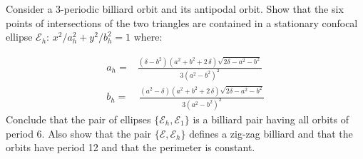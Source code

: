 \begin{exercise}
 Consider a 3-periodic billiard orbit and its antipodal orbit. Show that the six points of intersections of the two triangles are contained in a stationary confocal ellipse $\mathcal{E}_h$: $x^2/a_h^2+y^2/b_h^2=1$ where:


\begin{align*}
	a_h=& {\frac { \left(  \delta -b^2\right) \left( {a}^{2}+{b}^{2}+2\,\delta \right)\sqrt {2\delta-{a}^{2}-{b}^{2} 
			 }  }{3 \left( {a}^{2}-{
				b}^{2} \right) ^{2}}}\\
b_h=&  \,{\frac {\left( {a}^{2}-\delta \right)  \left( {a}^{2}+{b}^{2}+2\,\delta \right) \sqrt {2\delta -{a}^{2
			}-{b}^{2} } }{3 \left( {a}^{2}-
		{b}^{2} \right) ^{2}}}
%
\end{align*}
Conclude that the pair of ellipses $\{\mathcal{E}_h, \mathcal{E}_1\}$ is a billiard pair having all orbits of period 6.
Also show that the pair $\{\mathcal{E} , \mathcal{E}_h \}$ defines a zig-zag billiard and that the orbits have period 12 and  that the perimeter is  constant. %
\end{exercise}




